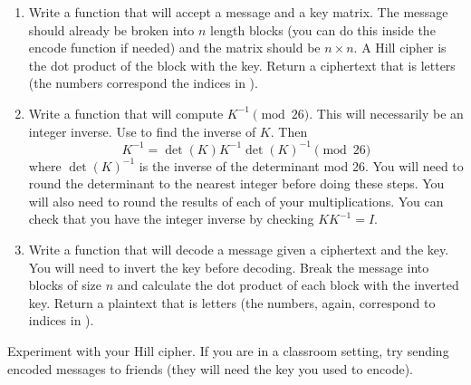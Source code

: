 \begin{problem}
\begin{enumerate}
\item Write a function that will accept a message and a key matrix.
The message should already be broken into $n$ length blocks (you can do this inside the encode function if needed) and the matrix should be $n \times n$.
A Hill cipher is the dot product of the block with the key.  Return a ciphertext that is letters (the numbers correspond the indices in ).

\item Write a function that will compute $K^{-1} \pmod{26}$.  This will necessarily be an integer inverse.
Use  to find the inverse of $K$.
Then \[K^{-1} = \det(K)K^{-1}\det(K)^{-1}  \pmod{26}\] where $\det(K)^{-1}$ is the inverse of the determinant mod 26.
You will need to round the determinant to the nearest integer before doing these steps.  You will also need to round the results of each of your multiplications.
You can check that you have the integer inverse by checking $KK^{-1} = I$.

\item Write a function that will decode a message given a ciphertext and the key.
You will need to invert the key before decoding.  Break the message into blocks of size $n$ and calculate the dot product of each block with the inverted key.
Return a plaintext that is letters (the numbers, again, correspond to indices in ).
\end{enumerate}

Experiment with your Hill cipher.  If you are in a classroom setting, try sending encoded messages to friends (they will need the key you used to encode).
\end{problem}


